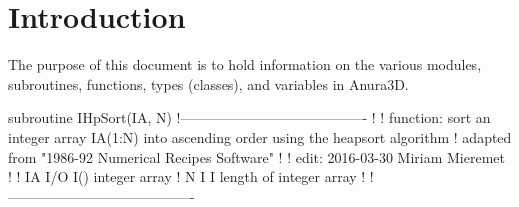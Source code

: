 \chapter{Introduction}

The purpose of this document is to hold information on the various modules, subroutines, functions, types (classes), and variables in Anura3D.

\begin{fortransubroutine}[MySubroutine]
    subroutine IHpSort(IA, N)
      !----------------------------------------
      !
      !  function: sort an integer array IA(1:N) into ascending order using the heapsort algorithm
      !            adapted from "1986-92 Numerical Recipes Software"
      !
      !  edit: 2016-03-30 Miriam Mieremet 
      !
      !  IA   I/O   I()   integer array
      !  N    I     I     length of integer array
      !
      !----------------------------------------
\end{fortransubroutine}
